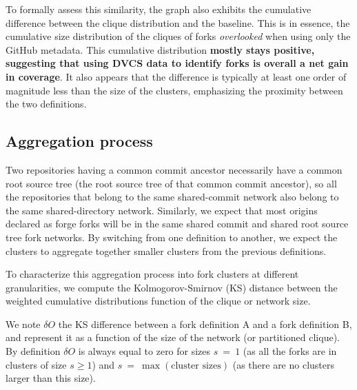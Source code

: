 To formally assess this similarity, the graph also exhibits the cumulative
difference between the clique distribution and the baseline. This is in
essence, the cumulative size distribution of the cliques of forks
\emph{overlooked} when using only the GitHub metadata. 
This cumulative
distribution \textbf{mostly stays positive, suggesting that using DVCS data to
identify forks is overall a net gain in coverage}.
It also appears that the
difference is typically at least one order of magnitude less than the size of
the clusters, emphasizing the proximity between the two definitions.

\subsection{Aggregation process}
\label{sec:forks-aggregation-process}

Two repositories having a common commit ancestor necessarily have a common root
source tree (the root source tree of that common commit ancestor), so all the
repositories that belong to the same shared-commit network also belong to
the same shared-directory network.
Similarly, we expect that most origins declared as forge forks will be
in the same shared commit and shared root source tree fork networks.
By switching from one definition to another, we expect the clusters to
aggregate together smaller clusters from the previous definitions.

To characterize this aggregation process into fork clusters at different
granularities, we compute the Kolmogorov-Smirnov (KS) distance between the
weighted cumulative distributions function of the clique or network size.

We note $\delta O$ the KS difference between a fork
definition A and a fork definition B, and
represent it as a function of the size of the network (or partitioned clique).
By definition $\delta O$ is always equal to zero for sizes $s~=~1$ (as all the
forks are in clusters of size $s \geq 1$) and $s~=~\max(\text{cluster
sizes})$ (as there are no clusters larger than this size).

